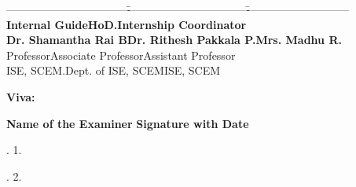 \documentclass[12pt,a4paper,openany]{report}
\begin{document}
\par
\vspace{0.35in}

\begin{tabbing}
---------------------------------\hspace{0.5in}\=---------------------------------\hspace{0.4in}\=----------------------------\\
\hspace{0.10in}\textbf{Internal Guide}\>\hspace{0.60in}\textbf{HoD.}\>\hspace{0.25in}\textbf{Internship Coordinator}\\
\hspace{0.10in}\textbf{Dr. Shamantha Rai B}\>\hspace{0.05in}\textbf{Dr. Rithesh Pakkala P.}\>\hspace{0.50in}\textbf{Mrs. Madhu R.}\\
\hspace{0.25in}Professor\>\hspace{0.25in}Associate Professor\>\hspace{0.40in}Assistant Professor\\
\hspace{0.25in}ISE, SCEM.\>\hspace{0.25in}Dept. of ISE, SCEM\>\hspace{0.70in}ISE, SCEM\\
\end{tabbing}

\vspace{0.3in}
\noindent \textbf{Viva:}

\vspace{0.2in}
\noindent \textbf{Name of the Examiner} \hspace{1.8in} \textbf{Signature with Date}

\vspace{0.15in}
. \dotfill \hspace{0.3in} 1. \dotfill

\vspace{0.15in}
. \dotfill \hspace{0.3in} 2. \dotfill
\end{document}
